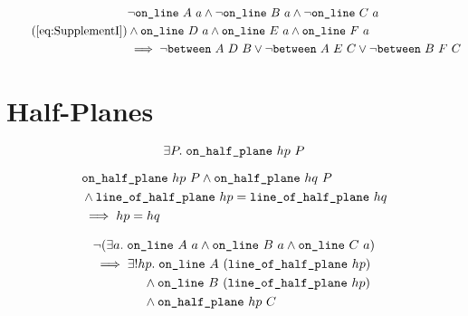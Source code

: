 \begin{equation}\tag{\ref{eq:SupplementI}}
  \begin{split}
    &\neg\code{on\_line}\ A\ a \wedge \neg\code{on\_line}\ B\ a \wedge \neg\code{on\_line}\ C\ a\\
    &\wedge \code{on\_line}\ D\ a \wedge \code{on\_line}\ E\ a \wedge \code{on\_line}\ F\ a\\
    &\implies \neg\between{A}{D}{B} \vee \neg\between{A}{E}{C} \vee \neg\between{B}{F}{C}
  \end{split}
\end{equation}

\section{Half-Planes}
\begin{equation*}
  \exists P.\; \texttt{on\_half\_plane}\ hp\ P
\end{equation*}

\begin{equation*}
  \begin{split}
    &\texttt{on\_half\_plane}\ hp\ P \wedge \texttt{on\_half\_plane}\ hq\ P\\
    &\wedge\texttt{line\_of\_half\_plane}\ hp = \texttt{line\_of\_half\_plane}\ hq\\
    &\implies hp = hq
  \end{split}
\end{equation*}

\begin{equation*}
  \begin{split}
    &\neg(\exists a.\; \texttt{on\_line}\ A\ a\wedge \texttt{on\_line}\ B\ a\wedge \texttt{on\_line}\ C\ a)\\
    &\implies \exists! hp.\; \texttt{on\_line}\ A\ (\texttt{line\_of\_half\_plane}\ hp)\\
    &\qquad\qquad\wedge\texttt{on\_line}\ B\ (\texttt{line\_of\_half\_plane}\ hp)\\
    &\qquad\qquad\wedge\texttt{on\_half\_plane}\ hp\ C
\end{split}
\end{equation*}

